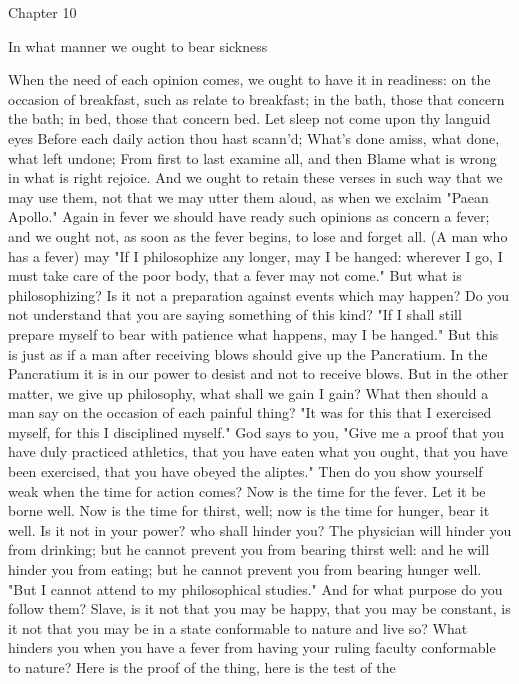 \documentclass[a4paper]{article}
\begin{document}
Chapter 10

In what manner we ought to bear sickness

    When the need of each opinion comes, we ought to have it in readiness: on
the occasion of breakfast, such as relate to breakfast; in the bath, those that
concern the bath; in bed, those that concern bed.
       Let sleep not come upon thy languid eyes
       Before each daily action thou hast scann'd;
       What's done amiss, what done, what left undone;
       From first to last examine all, and then
       Blame what is wrong in what is right rejoice.
    And we ought to retain these verses in such way that we may use them, not
that we may utter them aloud, as when we exclaim "Paean Apollo." Again in fever
we should have ready such opinions as concern a fever; and we ought not, as
soon as the fever begins, to lose and forget all. (A man who has a fever) may
"If I philosophize any longer, may I be hanged: wherever I go, I must take care
of the poor body, that a fever may not come." But what is philosophizing? Is it
not a preparation against events which may happen? Do you not understand that
you are saying something of this kind? "If I shall still prepare myself to bear
with patience what happens, may I be hanged." But this is just as if a man
after receiving blows should give up the Pancratium. In the Pancratium it is in
our power to desist and not to receive blows. But in the other matter, we give
up philosophy, what shall we gain I gain? What then should a man say on the
occasion of each painful thing? "It was for this that I exercised myself, for
this I disciplined myself." God says to you, "Give me a proof that you have
duly practiced athletics, that you have eaten what you ought, that you have
been exercised, that you have obeyed the aliptes." Then do you show yourself
weak when the time for action comes? Now is the time for the fever. Let it be
borne well. Now is the time for thirst, well; now is the time for hunger, bear
it well. Is it not in your power? who shall hinder you? The physician will
hinder you from drinking; but he cannot prevent you from bearing thirst well:
and he will hinder you from eating; but he cannot prevent you from bearing
hunger well.
    "But I cannot attend to my philosophical studies." And for what purpose do
you follow them? Slave, is it not that you may be happy, that you may be
constant, is it not that you may be in a state conformable to nature and live
so? What hinders you when you have a fever from having your ruling faculty
conformable to nature? Here is the proof of the thing, here is the test of the
\end{document}
